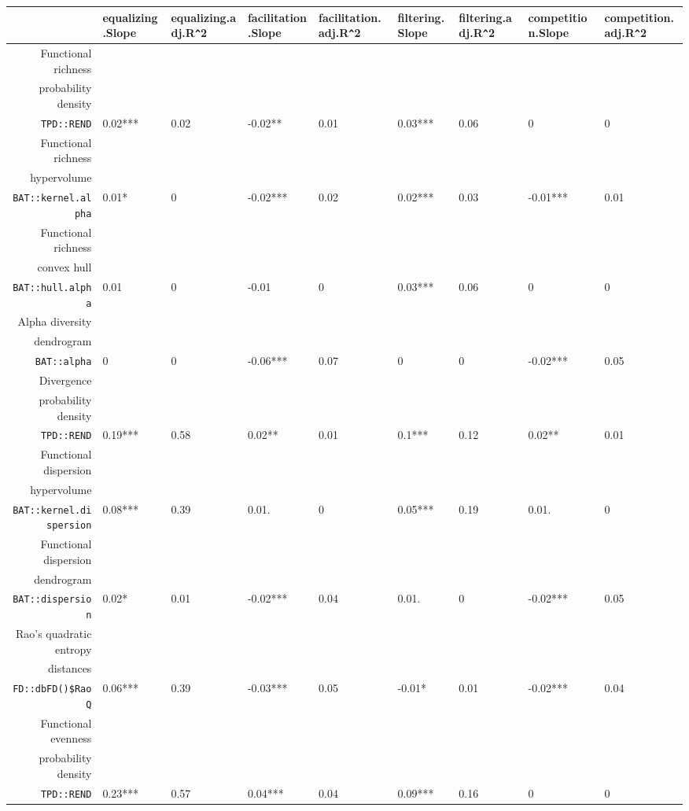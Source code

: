\begin{table}[ht]
\centering
\scriptsize
\begin{tabular}{rllllllll}
  \hline
 & equalizing.Slope & equalizing.adj.R\verb|^|2 & facilitation.Slope & facilitation.adj.R\verb|^|2 & filtering.Slope & filtering.adj.R\verb|^|2 & competition.Slope & competition.adj.R\verb|^|2 \\ 
  \hline
Functional richness\\ probability density\\ \texttt{TPD::REND} & 0.02*** & 0.02 & -0.02** & 0.01 & 0.03*** & 0.06 & 0 & 0 \\ 
  Functional richness\\ hypervolume\\ \texttt{BAT::kernel.alpha} & 0.01* & 0 & -0.02*** & 0.02 & 0.02*** & 0.03 & -0.01*** & 0.01 \\ 
  Functional richness\\ convex hull\\ \texttt{BAT::hull.alpha} & 0.01 & 0 & -0.01 & 0 & 0.03*** & 0.06 & 0 & 0 \\ 
  Alpha diversity\\ dendrogram\\ \texttt{BAT::alpha} & 0 & 0 & -0.06*** & 0.07 & 0 & 0 & -0.02*** & 0.05 \\ 
  Divergence\\ probability density\\ \texttt{TPD::REND} & 0.19*** & 0.58 & 0.02** & 0.01 & 0.1*** & 0.12 & 0.02** & 0.01 \\ 
  Functional dispersion\\ hypervolume\\ \texttt{BAT::kernel.dispersion} & 0.08*** & 0.39 & 0.01. & 0 & 0.05*** & 0.19 & 0.01. & 0 \\ 
  Functional dispersion\\ dendrogram\\ \texttt{BAT::dispersion} & 0.02* & 0.01 & -0.02*** & 0.04 & 0.01. & 0 & -0.02*** & 0.05 \\ 
  Rao's quadratic entropy\\ distances\\ \texttt{FD::dbFD()\$RaoQ} & 0.06*** & 0.39 & -0.03*** & 0.05 & -0.01* & 0.01 & -0.02*** & 0.04 \\ 
  Functional evenness\\ probability density\\ \texttt{TPD::REND} & 0.23*** & 0.57 & 0.04*** & 0.04 & 0.09*** & 0.16 & 0 & 0 \\ 

\end{tabular}
\end{table}
